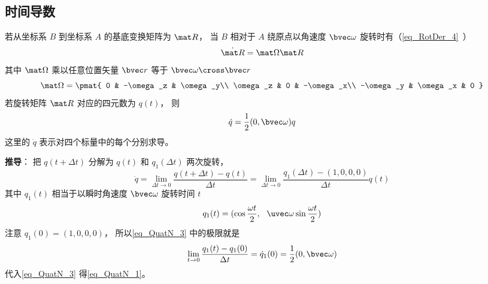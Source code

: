 \subsection{时间导数}
若从坐标系 $B$ 到坐标系 $A$ 的基底变换矩阵为 $\mat R$， 当 $B$ 相对于 $A$ 绕原点以角速度 $\bvec \omega$ 旋转时有（\autoref{eq_RotDer_4}~）
\begin{equation}
\dot{\mat R} = \mat \Omega \mat R
\end{equation}
其中 $\mat\Omega$ 乘以任意位置矢量 $\bvec r$ 等于 $\bvec \omega \cross \bvec r$
\begin{equation}
\mat \Omega = \pmat{
0 & -\omega_z & \omega_y\\
\omega_z & 0 & -\omega_x\\
-\omega_y & \omega_x & 0
}\end{equation}
若旋转矩阵 $\mat R$ 对应的四元数为 $q(t)$， 则
\begin{equation}\label{eq_QuatN_1}
\dot {q} = \frac12 (0, \bvec \omega) q
\end{equation}
这里的 $\dot{q}$ 表示对四个标量中的每个分别求导。

\textbf{推导}： 把 ${q}(t+\Delta t)$ 分解为 ${q}(t)$ 和 ${q}_1(\Delta t)$ 两次旋转， 
\begin{equation}\label{eq_QuatN_3}
\dot {q}
= \lim_{\Delta t\to 0}\frac{{q}(t+\Delta t) - {q}(t)}{\Delta t}
= \lim_{\Delta t\to 0}\frac{{q}_1(\Delta t) - (1,0,0,0)}{\Delta t}q(t)
\end{equation}
其中 ${q}_1(t)$ 相当于以瞬时角速度 $\bvec \omega$ 旋转时间 $t$
\begin{equation}
{q_1}(t) = (\cos\frac{\omega t}{2},\ \ \uvec \omega \sin\frac{\omega t}{2})
\end{equation}
注意 $q_1(0) = (1,0,0,0)$， 所以\autoref{eq_QuatN_3} 中的极限就是
\begin{equation}
\lim_{t\to 0}\frac{{q}_1(t) - {q}_1(0)}{\Delta t} = \dot{q}_1(0) = \frac{1}{2}(0, \bvec\omega)
\end{equation}
代入\autoref{eq_QuatN_3} 得\autoref{eq_QuatN_1}。
